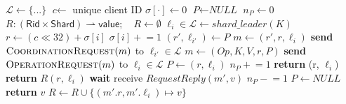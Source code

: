 \begin{algorithm}[!tb]
  \caption{Ellis\_Linear Client}
  \label{ellis-lin-clientprotocol}
  \begin{algorithmic}[1]
    \State $\mathcal{L} \gets \{...\}$ 
    \State $\textit{c} \gets$ unique client ID
    \State $\sigma[\cdot] \gets 0$ 
    \State $\textit{P} \gets \textit{NULL}$
    \State $n_P \gets 0$ 
    \State $R : (\mathsf{Rid}\times\mathsf{Shard}) \rightharpoonup \mathsf{value};\quad R \gets \emptyset$ 
      \State $\ell_i \in \mathcal{L} \gets shard\_leader(K)$
      \State $r \gets (c \ll 32) + \sigma[i]$ 
      \State $\sigma[i] \mathrel{+}= 1$
        \State $(r', \ell_{i'}) \gets P$ 
        \State $m \gets (r', r, \ell_i)$
        \State \textbf{send} $\textsc{CoordinationRequest}(m)$ to $\ell_{i'} \in \mathcal{L}$
        \EndIf
      \State $\textit{m} \gets (\textit{Op}, K, V, \textit{r}, \textit{P})$
      \State \textbf{send} $\textsc{OperationRequest}(m)$ to $\ell_{i} \in \mathcal{L}$
      \State $\textit{P} \gets (r, \ell_i)$
      \State $n_P \mathrel{+}=1$
      \State \textbf{return} (r, $\ell_i$) 
      \EndProcedure
        \State \textbf{return} $R(r,\ell_i)$
        \EndIf
        \State \textbf{wait} receive $RequestReply(m', v)$
        \State $n_P \mathrel{-}= 1$
          \State $P \gets NULL$
          \EndIf
          \State \textbf{return} $v$
          \Else
          \State $R \gets R \cup \{(m'.r, m'.\ell_i) \mapsto v\}$ 
          \EndIf
        \EndWhile
      \EndProcedure
  \end{algorithmic}
\end{algorithm}








